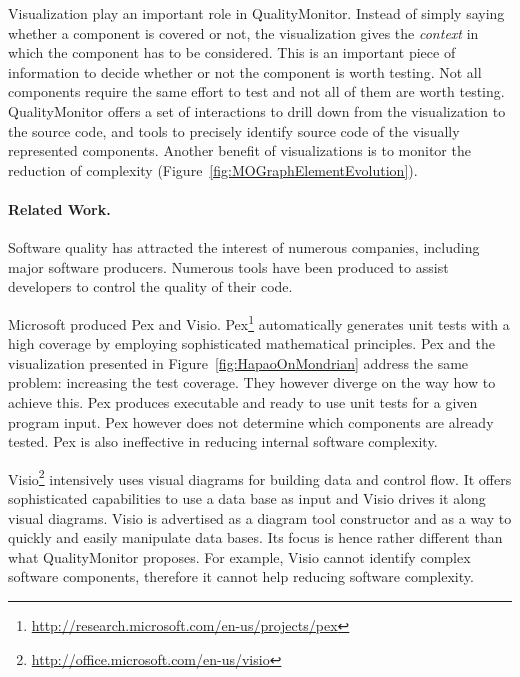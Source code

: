 \documentclass[runningheads]{llncs}
\newcommand{\dr}[1]{\nb{David}{orange}{#1}}
\newcommand{\figref}[1]{Figure~\ref{fig:#1}}
\begin{document}
Visualization play an important role in QualityMonitor. Instead of simply saying whether a component is covered or not, the visualization gives the \emph{context} in which the component has to be considered. This is an important piece of information to decide whether or not the component is worth testing. Not all components require the same effort to test and not all of them are worth testing. QualityMonitor offers a set of interactions to drill down from the visualization to the source code, and tools to precisely identify source code of the visually represented components. Another benefit of visualizations is to monitor the reduction of complexity (\figref{MOGraphElementEvolution}).


\paragraph{Related Work.}
Software quality has attracted the interest of numerous companies, including major software producers. 
Numerous tools have been produced to assist developers to control the quality of their code. 

Microsoft produced Pex and Visio. 
Pex\footnote{\url{http://research.microsoft.com/en-us/projects/pex}} automatically generates unit tests with a high coverage by employing sophisticated mathematical principles. Pex and the visualization presented in \figref{HapaoOnMondrian} address the same problem: increasing the test coverage. They however diverge on the way how to achieve this. Pex produces executable and ready to use unit tests for a given program input. Pex however does not determine which components are already tested. Pex is also ineffective in reducing internal software complexity.

Visio\footnote{\url{http://office.microsoft.com/en-us/visio}} intensively uses visual diagrams for building data and control flow. It offers sophisticated capabilities to use a data base as input and Visio drives it along visual diagrams\dr{I do not understand this sentence}. Visio is advertised as a diagram tool constructor and as a way to quickly and easily manipulate data bases. Its focus is hence rather different than what QualityMonitor proposes. For example, Visio cannot identify complex software components, therefore it cannot help reducing software complexity.
\end{document}
